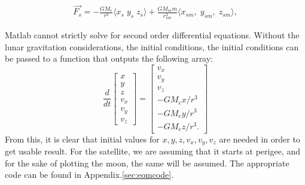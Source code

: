 \documentclass{article}
\begin{document}
\begin{align}
  \vec{F_{s}} = -\frac{GM_e}{r^3}\langle x_s \; y_s \; z_s \rangle +
  \frac{GM_mm}{r_{sm}^3}\langle x_{sm}, \; y_{sm}, \; z_{sm} \rangle,
\end{align}

Matlab cannot strictly solve for second order differential
equations. Without the lunar gravitation considerations, the initial
conditions, the initial conditions can be passed to a function that
outputs the following array:
\begin{equation}
  \frac{d}{dt}
  \begin{bmatrix}
    x \\ y \\ z \\ v_x \\ v_y \\ v_z
  \end{bmatrix} =
  \begin{bmatrix}
    v_x \\ v_y \\ v_z \\
    -GM_ex/r^3 \\
    -GM_ey/r^3 \\
    -GM_ez/r^3.
  \end{bmatrix}
\end{equation}
From this, it is clear that initial values for $x, y, z, v_x, v_y,
v_z$ are needed in order to get usable result. For the satellite, we
are assuming that it starts at perigee, and for the sake of plotting
the moon, the same will be assumed. The appropriate code can be found
in Appendix.\ref{sec:eomcode}.
\end{document}
